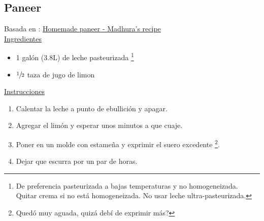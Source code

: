 \subsection{Paneer}

Basada en : \href{http://www.madhurasrecipe.com/veg/Homemade-Paneer}{Homemade paneer - Madhura's recipe} \\

\underline{Ingredientes}
\begin{itemize}
\item 1 gal\'on (3.8L) de leche pasteurizada \footnote{De preferencia pasteurizada a bajas temperaturas y no homogeneizada. Quitar crema si no está homogeneizada. No usar leche ultra-pasteurizada.}
\item $\sfrac{1}{2}$ taza de jugo de limon
\end{itemize}


\underline{Instrucciones}
\begin{enumerate}
\item Calentar la leche a punto de ebullición y apagar.
\item Agregar el limón y esperar unos minutos a que cuaje.
\item Poner en un molde con estame\~na y exprimir el suero excedente \footnote{Quedó muy aguada, quizá debí de exprimir más?}.
\item Dejar que escurra por un par de horas.
\end{enumerate}
